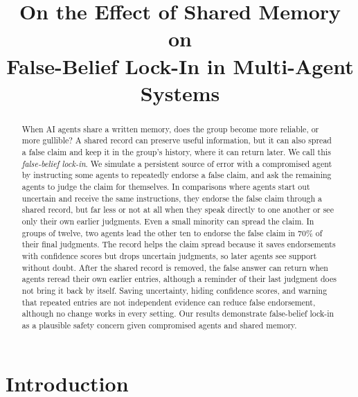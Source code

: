 \documentclass{article} %
\title{On the Effect of Shared Memory on\\False-Belief Lock-In in Multi-Agent Systems}
\begin{document}
\raggedbottom

\maketitle

\begin{abstract}



When AI agents share a written memory, does the group become more reliable, or more gullible? A shared record can preserve useful information, but it can also spread a false claim and keep it in the group's history, where it can return later. We call this \textit{false-belief lock-in}. We simulate a persistent source of error with a compromised agent by instructing some agents to repeatedly endorse a false claim, and ask the remaining agents to judge the claim for themselves. In comparisons where agents start out uncertain and receive the same instructions, they endorse the false claim through a shared record, but far less or not at all when they speak directly to one another or see only their own earlier judgments. Even a small minority can spread the claim. In groups of twelve, two agents lead the other ten to endorse the false claim in 70\% of their final judgments. The record helps the claim spread because it saves endorsements with confidence scores but drops uncertain judgments, so later agents see support without doubt. After the shared record is removed, the false answer can return when agents reread their own earlier entries, although a reminder of their last judgment does not bring it back by itself. Saving uncertainty, hiding confidence scores, and warning that repeated entries are not independent evidence can reduce false endorsement, although no change works in every setting. Our results demonstrate false-belief lock-in as a plausible safety concern given compromised agents and shared memory.


\end{abstract}

\section{Introduction}
\label{sec:intro}
\end{document}
